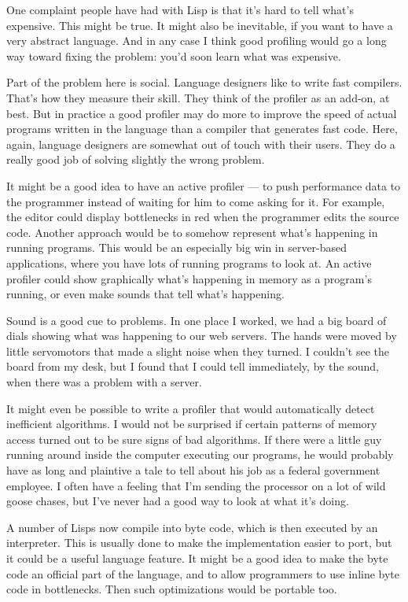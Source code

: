 \documentclass[12pt]{book}
\begin{document}
One complaint people have had with Lisp is that it's hard to tell what's
expensive. This might be true. It might also be inevitable, if you want
to have a very abstract language. And in any case I think good profiling
would go a long way toward fixing the problem: you'd soon learn what was
expensive.

Part of the problem here is social. Language designers like to write
fast compilers. That's how they measure their skill. They think of the
profiler as an add-on, at best. But in practice a good profiler may do
more to improve the speed of actual programs written in the language
than a compiler that generates fast code. Here, again, language
designers are somewhat out of touch with their users. They do a really
good job of solving slightly the wrong problem.

It might be a good idea to have an active profiler --- to push
performance data to the programmer instead of waiting for him to come
asking for it. For example, the editor could display bottlenecks in red
when the programmer edits the source code. Another approach would be to
somehow represent what's happening in running programs. This would be an
especially big win in server-based applications, where you have lots of
running programs to look at. An active profiler could show graphically
what's happening in memory as a program's running, or even make sounds
that tell what's happening.

Sound is a good cue to problems. In one place I worked, we had a big
board of dials showing what was happening to our web servers. The hands
were moved by little servomotors that made a slight noise when they
turned. I couldn't see the board from my desk, but I found that I could
tell immediately, by the sound, when there was a problem with a server.

It might even be possible to write a profiler that would automatically
detect inefficient algorithms. I would not be surprised if certain
patterns of memory access turned out to be sure signs of bad algorithms.
If there were a little guy running around inside the computer executing
our programs, he would probably have as long and plaintive a tale to
tell about his job as a federal government employee. I often have a
feeling that I'm sending the processor on a lot of wild goose chases,
but I've never had a good way to look at what it's doing.

A number of Lisps now compile into byte code, which is then executed by
an interpreter. This is usually done to make the implementation easier
to port, but it could be a useful language feature. It might be a good
idea to make the byte code an official part of the language, and to
allow programmers to use inline byte code in bottlenecks. Then such
optimizations would be portable too.
\end{document}
